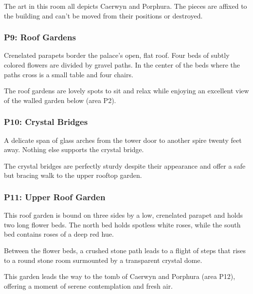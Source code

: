 \documentclass[10pt,a4paper,twoside,bg=print,twocolumn,openany,nodeprecatedcode]{dndbook}
\begin{document}
The art in this room all depicts Caerwyn and Porphura. The pieces are affixed to the building and can't be moved from their positions or destroyed.

\subsubsection{P9: Roof Gardens}
\begin{DndReadAloud}{}
Crenelated parapets border the palace's open, flat roof. Four beds of subtly colored flowers are divided by gravel paths. In the center of the beds where the paths cross is a small table and four chairs.

\end{DndReadAloud}

The roof gardens are lovely spots to sit and relax while enjoying an excellent view of the walled garden below (area P2).

\subsubsection{P10: Crystal Bridges}
\begin{DndReadAloud}{}
A delicate span of glass arches from the tower door to another spire twenty feet away. Nothing else supports the crystal bridge.

\end{DndReadAloud}

The crystal bridges are perfectly sturdy despite their appearance and offer a safe but bracing walk to the upper rooftop garden.

\subsubsection{P11: Upper Roof Garden}
\begin{DndReadAloud}{}
This roof garden is bound on three sides by a low, crenelated parapet and holds two long flower beds. The north bed holds spotless white roses, while the south bed contains roses of a deep red hue.

Between the flower beds, a crushed stone path leads to a flight of steps that rises to a round stone room surmounted by a transparent crystal dome.

\end{DndReadAloud}

This garden leads the way to the tomb of Caerwyn and Porphura (area P12), offering a moment of serene contemplation and fresh air.
\end{document}
